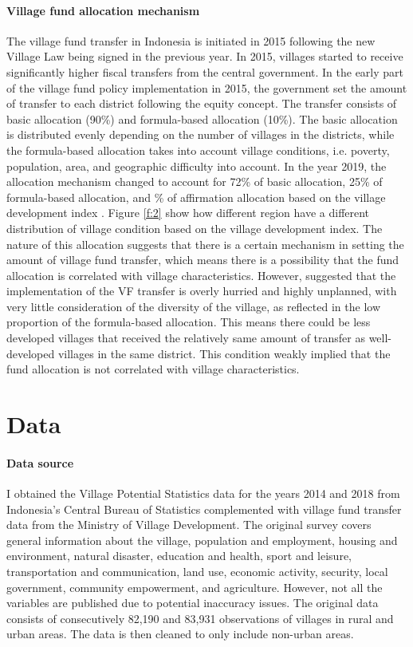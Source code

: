\documentclass[letterpaper,12pt,leqno]{article}
\begin{document}
\paragraph{Village fund allocation mechanism} The village fund transfer in Indonesia is initiated in 2015 following the new Village Law being signed in the previous year. In 2015, villages started to receive significantly higher fiscal transfers from the central government. In the early part of the village fund policy implementation in 2015, the government set the amount of transfer to each district following the equity concept. The transfer consists of basic allocation (90\%) and formula-based allocation (10\%). The basic allocation is distributed evenly depending on the number of villages in the districts, while the formula-based allocation takes into account village conditions, i.e. poverty, population, area, and geographic difficulty into account. In the year 2019, the allocation mechanism changed to account for 72\% of basic allocation, 25\% of formula-based allocation, and \3\% of affirmation allocation based on the village development index \citep{hartojo_2022}. Figure \ref{f:2} show how different region have a different distribution of village condition based on the village development index. The nature of this allocation suggests that there is a certain mechanism in setting the amount of village fund transfer, which means there is a possibility that the fund allocation is correlated with village characteristics. However, \citet{lewis_2015} suggested that the implementation of the VF transfer is overly hurried and highly unplanned, with very little consideration of the diversity of the village, as reflected in the low proportion of the formula-based allocation. This means there could be less developed villages that received the relatively same amount of transfer as well-developed villages in the same district. This condition weakly implied that the fund allocation is not correlated with village characteristics.

\section{Data}\label{s:data}

\paragraph{Data source} I obtained the Village Potential Statistics data for the years 2014 and 2018 from Indonesia's Central Bureau of Statistics complemented with village fund transfer data from the Ministry of Village Development. The original survey covers general information about the village, population and employment, housing and environment, natural disaster, education and health, sport and leisure, transportation and communication, land use, economic activity, security, local government, community empowerment, and agriculture. However, not all the variables are published due to potential inaccuracy issues. The original data consists of consecutively 82,190 and 83,931 observations of villages in rural and urban areas. The data is then cleaned to only include non-urban areas.
\end{document}
